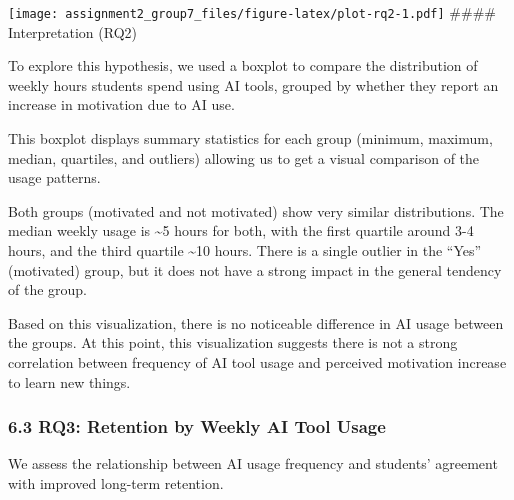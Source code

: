 \documentclass[
]{article}
\begin{document}
\texttt{[image: assignment2\_group7\_files/figure-latex/plot-rq2-1.pdf]}
\#\#\#\# Interpretation (RQ2)

To explore this hypothesis, we used a boxplot to compare the
distribution of weekly hours students spend using AI tools, grouped by
whether they report an increase in motivation due to AI use.

This boxplot displays summary statistics for each group (minimum,
maximum, median, quartiles, and outliers) allowing us to get a visual
comparison of the usage patterns.

Both groups (motivated and not motivated) show very similar
distributions. The median weekly usage is \textasciitilde5 hours for
both, with the first quartile around 3-4 hours, and the third quartile
\textasciitilde10 hours. There is a single outlier in the ``Yes''
(motivated) group, but it does not have a strong impact in the general
tendency of the group.

Based on this visualization, there is no noticeable difference in AI
usage between the groups. At this point, this visualization suggests
there is not a strong correlation between frequency of AI tool usage and
perceived motivation increase to learn new things.

\subsubsection{6.3 RQ3: Retention by Weekly AI Tool
Usage}\label{rq3-retention-by-weekly-ai-tool-usage}

We assess the relationship between AI usage frequency and students'
agreement with improved long-term retention.
\end{document}
